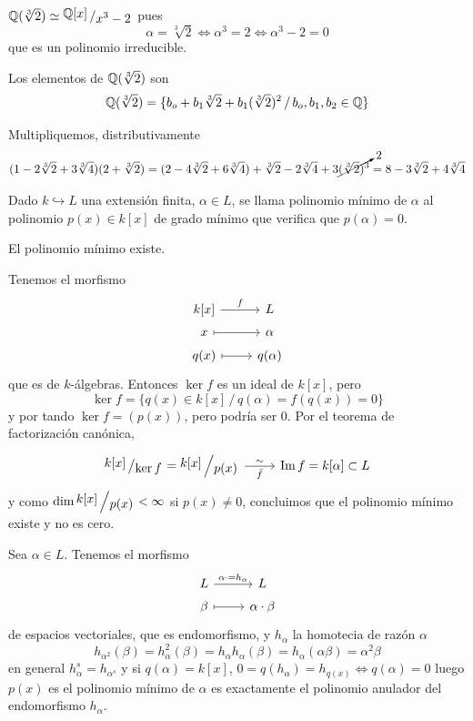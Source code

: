     \begin{ejem}
        $\bb Q(\sqrt[3]{2}) \simeq \modulo{\bb Q[x]}{x^3-2}$ pues 
        $$\alpha = \sqrt[3]{2} \iff \alpha^3 = 2 \iff \alpha^3-2=0$$
        que es un polinomio irreducible. 

        Los elementos de $\mathbb{Q}(\sqrt[3]{2})$ son 
        $$\mathbb{Q}(\sqrt[3]{2}) = \{b_o + b_1 \sqrt[3]{2} + b_1(\sqrt[3]{2})^2 \, /\, b_o,b_1,b_2\in \mathbb{Q}\}$$

        Multipliquemos, distributivamente
        $$(1-2\sqrt[3]{2}+3\sqrt[3]{4})(2+\sqrt[3]{2}) = (2-4\sqrt[3]{2} + 6 \sqrt[3]{4}) + \sqrt[3]{2} - 2\sqrt[3]{4} + 3 \cancelto{2}{(\sqrt[3]{2})^3} = 8 - 3 \sqrt[3]{2}+ 4 \sqrt[3]{4}$$
    \end{ejem}
    \begin{defi}
        Dado $k \hookrightarrow L$ una extensi\'on finita, $\alpha \in L$, se llama polinomio m\'inimo de $\alpha$ al polinomio $p(x) \in k[x]$ de grado m\'inimo que verifica que $p(\alpha)=0$.
    \end{defi}
    \begin{prop}
        El polinomio m\'inimo existe.
    \end{prop}
    \begin{dem}
        Tenemos el morfismo
        $$\bt k[x] \rar{f} & L \\[-5mm] x \rarmaps & \alpha \\[-5mm] q(x) \rarmaps & q(\alpha) \et$$
        que es de $k$-\'algebras. Entonces $\ker f$ es un ideal de $k[x]$, pero 
        $$\ker f = \{q(x) \in k[x] \, / \, q(\alpha) = f(q(x))=0 \}$$
        y por tando $\ker f = (p(x))$, pero podr\'ia ser 0. Por el teorema de factorizaci\'on can\'onica, 
        $$\bt \modulo{k{[x]}}{\ker f} = \modulo{k{[x]}}{p(x)} \rar{\sim}[swap]{\bar f} & \Im f = k[\alpha] \subset L \et$$ 
        y como $\dim \modulo{k[x]}{p(x)} < \infty$ si $p(x) \neq 0$, concluimos que el polinomio m\'inimo existe y no es cero.
    \end{dem}
    \begin{ejem}
         Sea $\alpha \in L$. Tenemos el morfismo
        $$\bt L \rar{\alpha\cdot = h_{\alpha}} & L \\[-5mm] \beta \rarmaps & \alpha \cdot \beta \et$$
        de espacios vectoriales, que es endomorfismo, y $h_{\alpha}$ la homotecia de raz\'on $\alpha$
        $$h_{\alpha^2}(\beta) = h^2_\alpha(\beta) = h_\alpha h_\alpha(\beta) = h_\alpha (\alpha \beta) = \alpha^2 \beta$$
        en general $h_\alpha^s = h_{\alpha^s}$ y si $q(\alpha) = k[x]$, $0=q(h_\alpha) = h_{q(x)} \iff q(\alpha) = 0$ luego $p(x)$ es el polinomio m\'inimo de $\alpha$ es exactamente el polinomio anulador del endomorfismo $h_\alpha$.
    \end{ejem}
